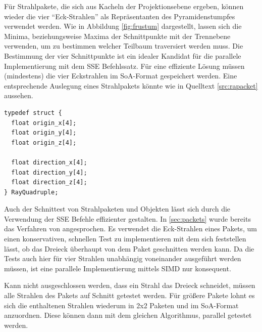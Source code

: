 Für Strahlpakete, die sich aus Kacheln der Projektionsebene ergeben, können wieder die vier ``Eck-Strahlen'' als Repräsentanten des Pyramidenstumpfes verwendet werden. Wie in Abbildung \ref{fig:frustum} dargestellt, lassen sich die Minima, beziehungsweise Maxima der Schnittpunkte mit der Trennebene verwenden, um zu bestimmen welcher Teilbaum traversiert werden muss.
Die Bestimmung der vier Schnittpunkte ist ein idealer Kandidat für die parallele Implementierung mit dem SSE Befehlssatz. Für eine effiziente Lösung müssen (mindestens) die vier Eckstrahlen im SoA-Format gespeichert werden. Eine entsprechende Auslegung eines Strahlpakets könnte wie in Quelltext \ref{src:rapacket} aussehen.

\begin{lstlisting}[float,label=src:rapacket,caption=Definition einer Datenstruktur für Strahlpakete im SoA-Format]
typedef struct {
  float origin_x[4];
  float origin_y[4];
  float origin_z[4];

  float direction_x[4];
  float direction_y[4];
  float direction_z[4];
} RayQuadruple;
\end{lstlisting}

Auch der Schnittest von Strahlpaketen und Objekten lässt sich durch die Verwendung der SSE Befehle effizienter gestalten. In \ref{sec:packets} wurde bereits das Verfahren von \cite{DHS04} angesprochen. Es verwendet die Eck-Strahlen eines Pakets, um einen konservativen, schnellen Test zu implementieren mit dem sich feststellen lässt, ob das Dreieck überhaupt von dem Paket geschnitten werden kann. Da die Tests auch hier für vier Strahlen unabhängig voneinander ausgeführt werden müssen, ist eine parallele Implementierung mittels SIMD nur konsequent.

Kann nicht ausgeschlossen werden, dass ein Strahl das Dreieck schneidet, müssen alle Strahlen des Pakets auf Schnitt getestet werden. Für größere Pakete lohnt es sich die enthaltenen Strahlen wiederum in 2x2 Paketen und im SoA-Format anzuordnen. Diese können dann mit dem gleichen Algorithmus, parallel getestet werden.


